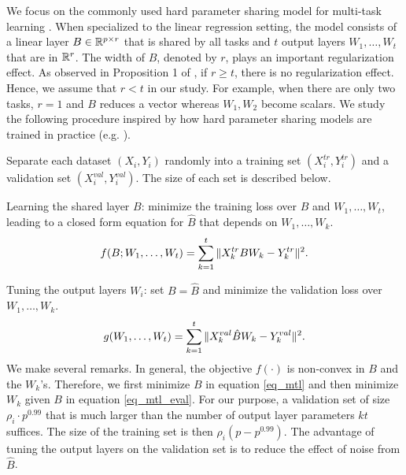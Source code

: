 We focus on the commonly used hard parameter sharing model for multi-task learning \cite{R17}.
When specialized to the linear regression setting, the model consists of a linear layer $B\in\mathbb{R}^{p\times r}$ that is shared by all tasks and $t$ output layers $W_1, \dots, W_t$ that are in $\mathbb{R}^r$.
The width of $B$, denoted by $r$, plays an important regularization effect.
As observed in Proposition 1 of \cite{WZR20}, if $r \ge t$, there is no regularization effect.
Hence, we assume that $r < t$ in our study.
For example, when there are only two tasks, $r = 1$ and $B$ reduces a vector whereas $W_1, W_2$ become scalars.
We study the following procedure inspired by how hard parameter sharing models are trained in practice (e.g. \cite{MTDNN19}).
\squishlist
	\item Separate each dataset $(X_i, Y_i)$ randomly into a training set $(X_i^{tr}, Y_i^{tr})$ and a validation set $(X_i^{val}, Y_i^{val})$.
	The size of each set is described below.
	\item Learning the shared layer $B$: minimize the training loss over $B$ and $W_1, \dots, W_t$, leading to a closed form equation for $\hat{B}$ that depends on $W_1,\dots, W_k$.
		\vspace{-0.075in}
		{\small\begin{align}\label{eq_mtl}
			f(B; W_1, \dots, W_t) = \sum_{k=1}^t \|X_k^{tr} B W_k - Y_k^{tr}\|^2.
		\end{align}}
		\vspace{-0.075in}
	\item Tuning the output layers $W_i$: set $B = \hat{B}$ and minimize the validation loss over $W_1,\dots, W_k$.
		\vspace{-0.075in}
		{\small\begin{align}\label{eq_mtl_eval}
			g(W_1, \dots, W_t) = \sum_{k=1}^t \|X_k^{val} \hat{B} W_k - Y_k^{val}\|^2.
		\end{align}}
		\vspace{-0.075in}
\squishend
\vspace{-0.1in}
We make several remarks.
In general, the objective $f(\cdot)$ is non-convex in $B$ and the $W_k$'s.
Therefore, we first minimize $B$ in equation \eqref{eq_mtl} and then minimize $W_k$ given $B$ in equation \eqref{eq_mtl_eval}.
For our purpose, a validation set of size $\rho_i \cdot p^{0.99}$ that is much larger than the number of output layer parameters $kt$ suffices.
The size of the training set is then $\rho_i (p - p^{0.99})$.
The advantage of tuning the output layers on the validation set is to reduce the effect of noise from $\hat{B}$.

